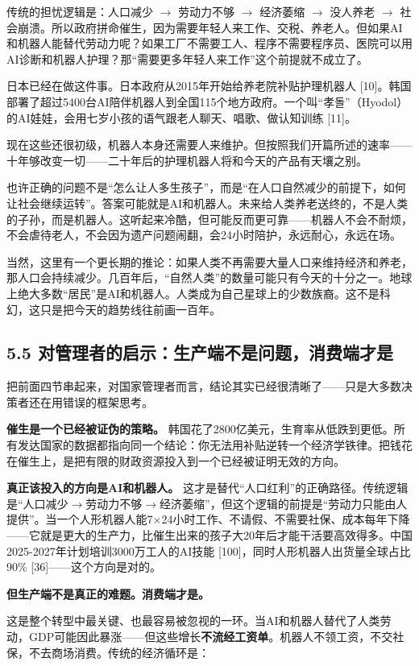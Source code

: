 \documentclass[11pt,a4paper]{ctexart}
\begin{document}
传统的担忧逻辑是：人口减少 $\to$ 劳动力不够 $\to$ 经济萎缩 $\to$ 没人养老 $\to$ 社会崩溃。所以政府拼命催生，因为需要年轻人来工作、交税、养老人。但如果AI和机器人能替代劳动力呢？如果工厂不需要工人、程序不需要程序员、医院可以用AI诊断和机器人护理？那“需要更多年轻人来工作”这个前提就不成立了。

日本已经在做这件事。日本政府从2015年开始给养老院补贴护理机器人 [10]。韩国部署了超过5400台AI陪伴机器人到全国115个地方政府。一个叫“孝{\korfont 돌}”（Hyodol）的AI娃娃，会用七岁小孩的语气跟老人聊天、唱歌、做认知训练 [11]。

现在这些还很初级，机器人本身还需要人来维护。但按照我们开篇所述的速率——十年够改变一切——二十年后的护理机器人将和今天的产品有天壤之别。

也许正确的问题不是“怎么让人多生孩子”，而是“在人口自然减少的前提下，如何让社会继续运转”。答案可能就是AI和机器人。未来给人类养老送终的，不是人类的子孙，而是机器人。这听起来冷酷，但可能反而更可靠——机器人不会不耐烦，不会虐待老人，不会因为遗产问题闹翻，会24小时陪护，永远耐心，永远在场。

当然，这里有一个更长期的推论：如果人类不再需要大量人口来维持经济和养老，那人口会持续减少。几百年后，“自然人类”的数量可能只有今天的十分之一。地球上绝大多数“居民”是AI和机器人。人类成为自己星球上的少数族裔。这不是科幻，这只是把今天的趋势线往前画一百年。

\subsection{5.5 对管理者的启示：生产端不是问题，消费端才是}

把前面四节串起来，对国家管理者而言，结论其实已经很清晰了——只是大多数决策者还在用错误的框架思考。

\textbf{催生是一个已经被证伪的策略。} 韩国花了2800亿美元，生育率从低跌到更低。所有发达国家的数据都指向同一个结论：你无法用补贴逆转一个经济学铁律。把钱花在催生上，是把有限的财政资源投入到一个已经被证明无效的方向。

\textbf{真正该投入的方向是AI和机器人。} 这才是替代“人口红利”的正确路径。传统逻辑是“人口减少$\to$劳动力不够$\to$经济萎缩”，但这个逻辑的前提是“劳动力只能由人提供”。当一个人形机器人能7$\times$24小时工作、不请假、不需要社保、成本每年下降——它就是更大的生产力，比催生出来的孩子大20年后才能干活要高效得多。中国2025-2027年计划培训3000万工人的AI技能 [100]，同时人形机器人出货量全球占比90\% [36]——这个方向是对的。

\textbf{但生产端不是真正的难题。消费端才是。}

这是整个转型中最关键、也最容易被忽视的一环。当AI和机器人替代了人类劳动，GDP可能因此暴涨——但这些增长\textbf{不流经工资单}。机器人不领工资，不交社保，不去商场消费。传统的经济循环是：
\end{document}
